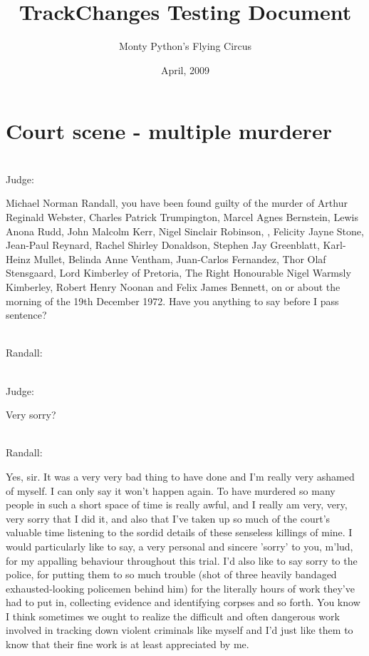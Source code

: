 \documentclass{report}
\title{TrackChanges Testing Document}
\author{Monty Python's Flying Circus}
\date{April, 2009}
\begin{document}
\maketitle

\chapter{Court scene - multiple murderer}


\noindent\\ Judge:

Michael Norman Randall, you have been found guilty of the murder of Arthur Reginald Webster, Charles Patrick Trumpington, Marcel Agnes Bernstein, Lewis Anona Rudd, John Malcolm Kerr, Nigel Sinclair Robinson, , Felicity Jayne Stone, Jean-Paul Reynard, Rachel Shirley Donaldson, Stephen Jay Greenblatt, Karl-Heinz Mullet, Belinda Anne Ventham, Juan-Carlos Fernandez, Thor Olaf Stensgaard, Lord Kimberley of Pretoria, The Right Honourable Nigel Warmsly Kimberley, Robert Henry Noonan and Felix James Bennett, on or about the morning of the 19th December 1972. Have you anything to say before I pass sentence?


\noindent\\ Randall: 	


\noindent\\ Judge: 	

Very sorry?

\noindent\\ Randall: 	

Yes, sir. It was a very very bad thing to have done and I'm really very ashamed of myself. I can only say it won't happen again. To have murdered so many people in such a short space of time is really awful, and I really am very, very, very sorry that I did it, and also that I've taken up so much of the court's valuable time listening to the sordid details of these senseless killings of mine. I would particularly like to say, a very personal and sincere 'sorry' to you, m'lud, for my appalling behaviour throughout this trial. I'd also like to say sorry to the police, for putting them to so much trouble (shot of three heavily bandaged exhausted-looking policemen behind him) for the literally hours of work they've had to put in, collecting evidence and identifying corpses and so forth. You know I think sometimes we ought to realize the difficult and often dangerous work involved in tracking down violent criminals like myself and I'd just like them to know that their fine work is at least appreciated by me.
\end{document}
